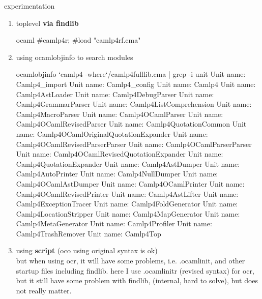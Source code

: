 \item  experimentation
  \begin{enumerate}
  \item toplevel {\bf via findlib}
\begin{bluecode}
ocaml
#camlp4r;
#load "camlp4rf.cma"
\end{bluecode}



  \item using ocamlobjinfo to search modules     


\begin{bluecode}
ocamlobjinfo `camlp4 -where`/camlp4fulllib.cma | grep -i unit
Unit name: Camlp4_import
Unit name: Camlp4_config
Unit name: Camlp4
Unit name: Camlp4AstLoader
Unit name: Camlp4DebugParser
Unit name: Camlp4GrammarParser
Unit name: Camlp4ListComprehension
Unit name: Camlp4MacroParser
Unit name: Camlp4OCamlParser
Unit name: Camlp4OCamlRevisedParser
Unit name: Camlp4QuotationCommon
Unit name: Camlp4OCamlOriginalQuotationExpander
Unit name: Camlp4OCamlRevisedParserParser
Unit name: Camlp4OCamlParserParser
Unit name: Camlp4OCamlRevisedQuotationExpander
Unit name: Camlp4QuotationExpander
Unit name: Camlp4AstDumper
Unit name: Camlp4AutoPrinter
Unit name: Camlp4NullDumper
Unit name: Camlp4OCamlAstDumper
Unit name: Camlp4OCamlPrinter
Unit name: Camlp4OCamlRevisedPrinter
Unit name: Camlp4AstLifter
Unit name: Camlp4ExceptionTracer
Unit name: Camlp4FoldGenerator
Unit name: Camlp4LocationStripper
Unit name: Camlp4MapGenerator
Unit name: Camlp4MetaGenerator
Unit name: Camlp4Profiler
Unit name: Camlp4TrashRemover
Unit name: Camlp4Top
\end{bluecode}



  \item using \textbf{script} (oco using original syntax is ok) \\
    but when using ocr, it will have some problems, i.e. .ocamlinit, and other startup files including findlib. here I use .ocamlinitr (revised syntax) for ocr, but it still have some problem with findlib, (internal, hard to solve), but does not really matter.



\end{enumerate}


